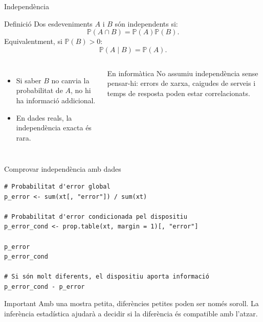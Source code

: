 \documentclass[10pt,aspectratio=169]{beamer}
\newcommand{\Prob}{\mathbb{P}}
\begin{document}
\begin{frame}{Independència}
\begin{block}{Definició}
Dos esdeveniments $A$ i $B$ són independents si:
\[
\Prob(A\cap B)=\Prob(A)\Prob(B).
\]
Equivalentment, si $\Prob(B)>0$:
\[
\Prob(A\mid B)=\Prob(A).
\]
\end{block}
\vspace{0.2cm}
\begin{columns}[T]
\begin{itemize}
  \item Si saber $B$ no canvia la probabilitat de $A$, no hi ha informació addicional.
  \item En dades reals, la independència exacta és rara.
\end{itemize}
\begin{alertblock}{En informàtica}
No assumiu independència sense pensar-hi: errors de xarxa, caigudes de serveis i temps de resposta poden estar correlacionats.
\end{alertblock}
\end{columns}
\end{frame}

\begin{frame}[fragile]{Comprovar independència amb dades}
\begin{lstlisting}
# Probabilitat d'error global
p_error <- sum(xt[, "error"]) / sum(xt)

# Probabilitat d'error condicionada pel dispositiu
p_error_cond <- prop.table(xt, margin = 1)[, "error"]

p_error
p_error_cond

# Si són molt diferents, el dispositiu aporta informació
p_error_cond - p_error
\end{lstlisting}
\vspace{0.15cm}
\begin{block}{Important}
Amb una mostra petita, diferències petites poden ser només soroll. La inferència estadística ajudarà a decidir si la diferència és compatible amb l'atzar.
\end{block}
\end{frame}
\end{document}
